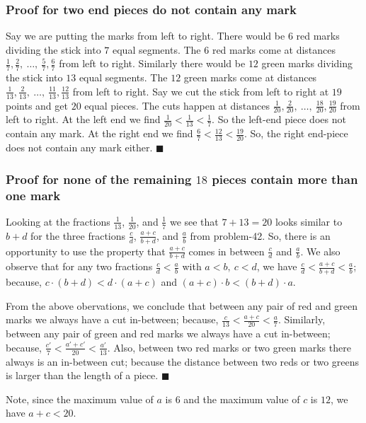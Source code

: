 \documentclass{article}
\begin{document}
\subsubsection{Proof for two end pieces do not contain any mark}
Say we are putting the marks from left to right. There would be $6$ red marks dividing the stick into $7$ equal segments. The $6$ red marks come at distances $\frac{1}{7}, \frac{2}{7},\ \ldots,\ \frac{5}{7}, \frac{6}{7}$ from left to right. Similarly there would be $12$ green marks dividing the stick into $13$ equal segments. The $12$ green marks come at distances $\frac{1}{13}, \frac{2}{13},\ \ldots,\ \frac{11}{13},\frac{12}{13}$ from left to right. Say we cut the stick from left to right at $19$ points and get $20$ equal pieces. The cuts happen at distances $\frac{1}{20}, \frac{2}{20},\ \ldots,\ \frac{18}{20}, \frac{19}{20}$ from left to right. At the left end we find $\frac{1}{20} < \frac{1}{13} < \frac{1}{7}$. So the left-end piece does not contain any mark. At the right end we find $\frac{6}{7} < \frac{12}{13} < \frac{19}{20}$. So, the right end-piece does not contain any mark either.  $\blacksquare$

\subsubsection{Proof for none of the remaining $18$ pieces contain more than one mark}
Looking at the fractions $\frac{1}{13}$, $\frac{1}{20}$, and $\frac{1}{7}$ we see that $7+13=20$ looks similar to $b+d$ for the three fractions $\frac{c}{d}$, $\frac{a+c}{b+d}$, and $\frac{a}{b}$ from problem-42. So, there is an opportunity to use the property that $\frac{a+c}{b+d}$ comes in between $\frac{c}{d}$ and $\frac{a}{b}$. We also observe that for any two fractions $\frac{c}{d} < \frac{a}{b}$ with $a < b,\ c < d$, we have $\frac{c}{d} < \frac{a+c}{b+d} < \frac{a}{b}$; because, $c \cdot (b+d) < d \cdot (a+c)$ and $(a+c) \cdot b < (b+d) \cdot a$.

From the above obervations, we conclude that between any pair of red and green marks we always have a cut in-between; because, $\frac{c}{13} < \frac{a+c}{20} < \frac{a}{7}$. Similarly, between any pair of green and red marks we always have a cut in-between; because, $\frac{c'}{7} < \frac{a'+c'}{20} < \frac{a'}{13}$. Also, between two red marks or two green marks there always is an in-between cut; because the distance between two reds or two greens is larger than the length of a piece.   $\blacksquare$

Note, since the maximum value of $a$ is $6$ and the maximum value of $c$ is $12$, we have $a+c < 20$.
\end{document}
